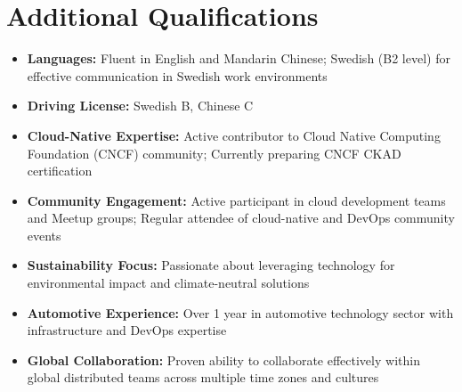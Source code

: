 \documentclass[11pt,a4paper]{article}
\begin{document}
\vspace{6pt}
\section*{Additional Qualifications}
\begin{itemize}[noitemsep]
\item \textbf{Languages:} Fluent in English and Mandarin Chinese; Swedish (B2 level) for effective communication in Swedish work environments
\item \textbf{Driving License:} Swedish B, Chinese C
\item \textbf{Cloud-Native Expertise:} Active contributor to Cloud Native Computing Foundation (CNCF) community; Currently preparing CNCF CKAD certification
\item \textbf{Community Engagement:} Active participant in cloud development teams and Meetup groups; Regular attendee of cloud-native and DevOps community events
\item \textbf{Sustainability Focus:} Passionate about leveraging technology for environmental impact and climate-neutral solutions
\item \textbf{Automotive Experience:} Over 1 year in automotive technology sector with infrastructure and DevOps expertise
\item \textbf{Global Collaboration:} Proven ability to collaborate effectively within global distributed teams across multiple time zones and cultures
\end{itemize}
\end{document}
